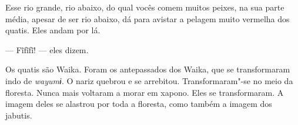Esse rio grande, rio abaixo, do qual vocês comem muitos peixes, na sua
parte média, apesar de ser rio abaixo, dá para avistar a pelagem muito
vermelha dos quatis. Eles andam por lá. 

--- Fĩfĩfĩ! --- eles dizem. 

Os quatis são Waika. Foram os antepassados dos Waika, que se
transformaram indo de \emph{wayumɨ}. O nariz quebrou e se arrebitou.
Transformaram"-se no meio da floresta. Nunca mais voltaram a morar em
xapono. Eles se transformaram. A imagem deles se alastrou por toda a
floresta, como também a imagem dos jabutis.

